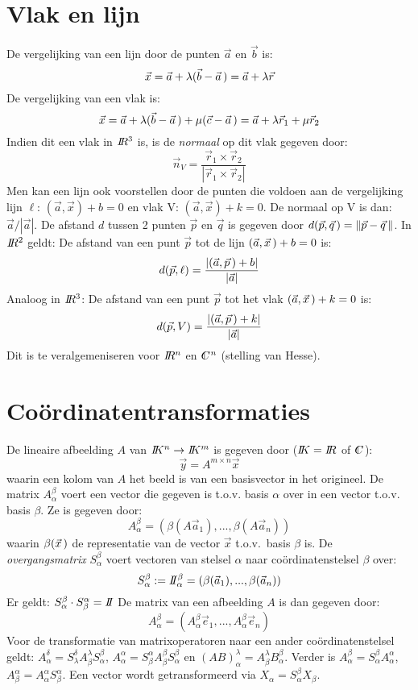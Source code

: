 \section{Vlak en lijn}
De vergelijking van een lijn door de punten $\vec{a}$ en $\vec{b}$ is:
\[
\vec{x}=\vec{a}+\lambda(\vec{b}-\vec{a}\,)=\vec{a}+\lambda\vec{r}
\]
De vergelijking van een vlak is:
\[
\vec{x}=\vec{a}+\lambda(\vec{b}-\vec{a}\,)+\mu(\vec{c}-\vec{a}\,)=\vec{a}+\lambda\vec{r}_1+\mu\vec{r}_2
\]
Indien dit een vlak in $I\hspace{-1mm}R^3$ is, is de {\it normaal} op dit vlak gegeven
door:
\[
\vec{n}_V=\frac{\vec{r}_1\times\vec{r}_2}{|\vec{r}_1\times\vec{r}_2|}
\]
Men kan een lijn ook voorstellen door de punten die voldoen aan de vergelijking
lijn $\ell$: $(\vec{a},\vec{x})+b=0$ en vlak V: $(\vec{a},\vec{x})+k=0$.
De normaal op V is dan: $\vec{a}/|\vec{a}|$.
\npar
De afstand $d$ tussen 2 punten $\vec{p}$ en $\vec{q}$ is gegeven door
$d(\vec{p},\vec{q}\,)=\|\vec{p}-\vec{q}\,\|$.
\npar
In $I\hspace{-1mm}R^2$ geldt:
De afstand van een punt $\vec{p}$ tot de lijn $(\vec{a},\vec{x}\,)+b=0$ is:
\[
d(\vec{p},\ell)=\frac{|(\vec{a},\vec{p}\,)+b|}{|\vec{a}|}
\]
Analoog in $I\hspace{-1mm}R^3$:
De afstand van een punt $\vec{p}$ tot het vlak $(\vec{a},\vec{x}\,)+k=0$ is:
\[
d(\vec{p},V)=\frac{|(\vec{a},\vec{p}\,)+k|}{|\vec{a}|}
\]
Dit is te veralgemeniseren voor $I\hspace{-1mm}R^n$ en $\CC^n$ (stelling van Hesse).

\section{Co\"ordinatentransformaties}
De lineaire afbeelding $A$ van $I\hspace{-1mm}K^n\rightarrow I\hspace{-1mm}K^m$ is gegeven door
($I\hspace{-1mm}K=I\hspace{-1mm}R$ of $\CC$):
\[
\vec{y}=A^{m\times n}\vec{x}
\]
waarin een kolom van $A$ het beeld is van een basisvector in het origineel.
\npar
De matrix $A_\alpha^\beta$ voert een vector die gegeven is t.o.v. basis
$\alpha$ over in een vector t.o.v. basis $\beta$. Ze is gegeven door:
\[
A_\alpha^\beta=\left(\beta(A\vec{a}_1),...,\beta(A\vec{a}_n)\right)
\]
waarin $\beta(\vec{x}\,)$ de representatie van de vector $\vec{x}$
t.o.v.\ basis $\beta$ is.
\npar
De {\it overgangsmatrix} $S_\alpha^\beta$ voert vectoren van stelsel $\alpha$
naar co\"ordinatenstelsel $\beta$ over:
\[
S_\alpha^\beta:=I\hspace{-1mm}I_\alpha^\beta=\left(\beta(\vec{a}_1),...,\beta(\vec{a}_n)\right)
\]
Er geldt: $S_\alpha^\beta\cdot S_\beta^\alpha=I\hspace{-1mm}I$
\npar
De matrix van een afbeelding $A$ is dan gegeven door:
\[
A_\alpha^\beta=\left(A_\alpha^\beta\vec{e}_1,...,A_\alpha^\beta\vec{e}_n\right)
\]
Voor de transformatie van matrixoperatoren naar een ander co\"ordinatenstelsel
geldt: $A_\alpha^\delta=S_\lambda^\delta A_\beta^\lambda S_\alpha^\beta$,
$A_\alpha^\alpha=S_\beta^\alpha A_\beta^\beta S_\alpha^\beta$ en
$(AB)_\alpha^\lambda=A_\beta^\lambda B_\alpha^\beta$.
\npar
Verder is $A_\alpha^\beta=S_\alpha^\beta A_\alpha^\alpha$,
$A_\beta^\alpha=A_\alpha^\alpha S_\beta^\alpha$. Een vector wordt
getransformeerd via $X_\alpha=S_\alpha^\beta X_\beta$.


